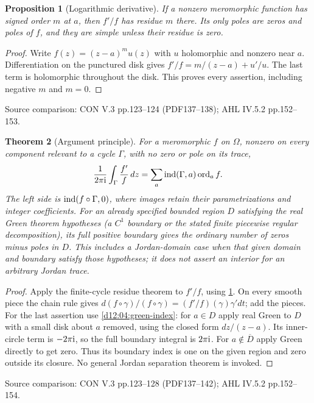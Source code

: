 \documentclass[11pt,a4paper,openany]{book}
\newtheorem{theorem}{Theorem}[chapter]
\newtheorem{proposition}[theorem]{Proposition}
\theoremstyle{definition}
\theoremstyle{remark}\newtheorem{remark}[theorem]{Remark}
\newcommand{\family}[1]{}
\newcommand{\source}[1]{\par\begingroup\small\sffamily\color{black!65}Source comparison: #1\par\endgroup}
\begin{document}
\begin{proposition}[Logarithmic derivative]\family{D12.09.01}\label{d12:09-01}
If a nonzero meromorphic function has signed order $m$ at $a$, then $f'/f$ has residue $m$ there. Its only poles are zeros and poles of $f$, and they are simple unless their residue is zero.
\end{proposition}
\begin{proof}
Write $f(z)=(z-a)^m u(z)$ with $u$ holomorphic and nonzero near $a$. Differentiation on the punctured disk gives $f'/f=m/(z-a)+u'/u$. The last term is holomorphic throughout the disk. This proves every assertion, including negative $m$ and $m=0$.
\end{proof}
\source{CON V.3 pp.123--124 (PDF137--138); AHL IV.5.2 pp.152--153.}

\begin{theorem}[Argument principle]\family{D12.09.02}\label{d12:09-02}
For a meromorphic $f$ on $\Omega$, nonzero on every component relevant to a cycle $\Gamma$, with no zero or pole on its trace,
\[
 \frac1{2\pi\mathrm i}\int_\Gamma\frac{f'}f\,dz
 =\sum_{a}\operatorname{ind}(\Gamma,a)\operatorname{ord}_a f.
\]
The left side is $\operatorname{ind}(f\circ\Gamma,0)$, where images retain their parametrizations and integer coefficients. For an already specified bounded region $D$ satisfying the real Green theorem hypotheses (a $C^1$ boundary or the stated finite piecewise regular decomposition), its full positive boundary gives the ordinary number of zeros minus poles in $D$. This includes a Jordan-domain case when that given domain and boundary satisfy those hypotheses; it does not assert an interior for an arbitrary Jordan trace.
\end{theorem}
\begin{proof}
Apply the finite-cycle residue theorem to $f'/f$, using \cref{d12:09-01}. On every smooth piece the chain rule gives $d(f\circ\gamma)/(f\circ\gamma)=(f'/f)(\gamma)\gamma' dt$; add the pieces. For the last assertion use \cref{d12:04:green-index}: for $a\in D$ apply real Green to $D$ with a small disk about $a$ removed, using the closed form $dz/(z-a)$. Its inner-circle term is $-2\pi\mathrm i$, so the full boundary integral is $2\pi\mathrm i$. For $a\notin\overline D$ apply Green directly to get zero. Thus its boundary index is one on the given region and zero outside its closure. No general Jordan separation theorem is invoked.
\end{proof}
\source{CON V.3 pp.123--128 (PDF137--142); AHL IV.5.2 pp.152--154.}
\end{document}
